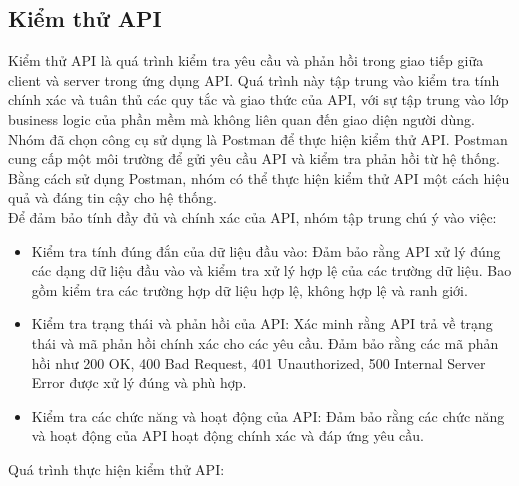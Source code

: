 \subsection{Kiểm thử API}
Kiểm thử API là quá trình kiểm tra yêu cầu và phản hồi trong giao tiếp giữa client và server trong ứng dụng API. Quá trình này tập trung vào kiểm tra tính chính xác và tuân thủ các quy tắc và giao thức của API, với sự tập trung vào lớp business logic của phần mềm mà không liên quan đến giao diện người dùng. \\

Nhóm đã chọn công cụ sử dụng là Postman để thực hiện kiểm thử API. Postman cung cấp một môi trường để gửi yêu cầu API và kiểm tra phản hồi từ hệ thống. Bằng cách sử dụng Postman, nhóm có thể thực hiện kiểm thử API một cách hiệu quả và đáng tin cậy cho hệ thống. \\

Để đảm bảo tính đầy đủ và chính xác của API, nhóm tập trung chú ý vào việc:

\begin{itemize}
    \item Kiểm tra tính đúng đắn của dữ liệu đầu vào: Đảm bảo rằng API xử lý đúng các dạng dữ liệu đầu vào và kiểm tra xử lý hợp lệ của các trường dữ liệu. Bao gồm kiểm tra các trường hợp dữ liệu hợp lệ, không hợp lệ và ranh giới.

    \item Kiểm tra trạng thái và phản hồi của API: Xác minh rằng API trả về trạng thái và mã phản hồi chính xác cho các yêu cầu. Đảm bảo rằng các mã phản hồi như 200 OK, 400 Bad Request, 401 Unauthorized, 500 Internal Server Error được xử lý đúng và phù hợp.

    \item Kiểm tra các chức năng và hoạt động của API: Đảm bảo rằng các chức năng và hoạt động của API hoạt động chính xác và đáp ứng yêu cầu. 
\end{itemize}

Quá trình thực hiện kiểm thử API:

